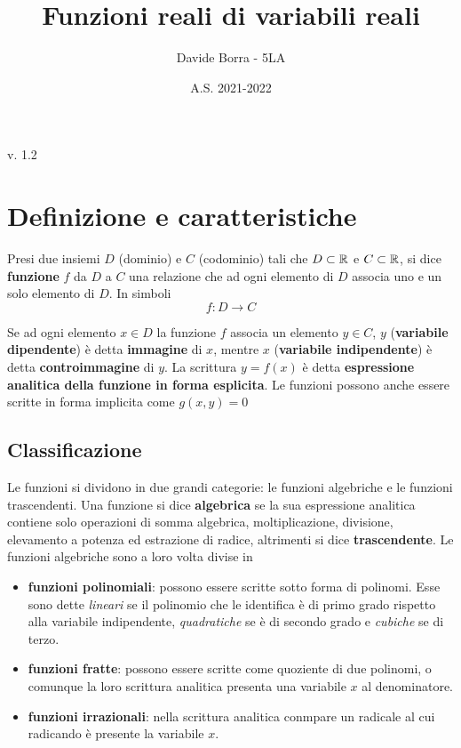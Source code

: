 \documentclass{article}     %
\title{Funzioni reali di variabili reali}
\author{Davide Borra - 5LA}
\date{A.S. 2021-2022}
\begin{document}
    \begin{titlepage}
    \maketitle
    \tableofcontents
    \vspace{\fill}
    \hspace{\fill} v. 1.2   %
    \end{titlepage}
    
    \chead{}

    \section{Definizione e caratteristiche}
        \begin{definition}
            Presi due insiemi $D$ (dominio) e $C$ (codominio) tali che $D \subset \mathbb{R}$ e $C \subset \mathbb{R}$, si dice \textbf{funzione} $f$ da $D$ a $C$ una relazione che ad ogni elemento di $D$ associa uno e un solo elemento di $D$. In simboli \[f:D\rightarrow C\]
        \end{definition}
        Se ad ogni elemento $x \in D$ la funzione $f$ associa un elemento $y\in C$, $y$ (\textbf{variabile dipendente}) è detta \textbf{immagine} di $x$, mentre $x$ (\textbf{variabile indipendente}) è detta \textbf{controimmagine} di $y$. La scrittura $y=f(x)$ è detta \textbf{espressione analitica della funzione in forma esplicita}. Le funzioni possono anche essere scritte in forma implicita come $g(x,y)=0$
    
    \subsection{Classificazione}
        Le funzioni si dividono in due grandi categorie: le funzioni algebriche e le funzioni trascendenti. Una funzione si dice \textbf{algebrica} se la sua espressione analitica contiene solo operazioni di somma algebrica, moltiplicazione, divisione, elevamento a potenza ed estrazione di radice, altrimenti si dice \textbf{trascendente}. Le funzioni algebriche sono a loro volta divise in \begin{itemize}
            \item \textbf{funzioni polinomiali}: possono essere scritte sotto forma di polinomi. Esse sono dette \textit{lineari} se il polinomio che le identifica è di primo grado rispetto alla variabile indipendente, \textit{quadratiche} se è di secondo grado e \textit{cubiche} se di terzo.
            \item \textbf{funzioni fratte}: possono essere scritte come quoziente di due polinomi, o comunque la loro scrittura analitica presenta una variabile $x$ al denominatore.
            \item \textbf{funzioni irrazionali}: nella scrittura analitica conmpare un radicale al cui radicando è presente la variabile $x$.
        \end{itemize}
\end{document}

